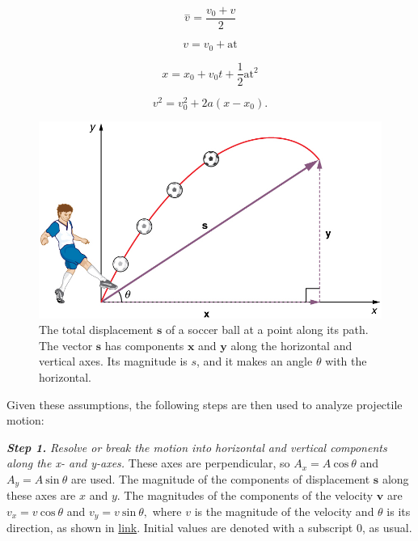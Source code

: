 \documentclass[
]{book}
\begin{document}
\leavevmode{}%
\[{{\overset{-}{v} =}\frac{v_{0} + v}{2}}{}\]

\leavevmode{}%
\[{v = {v_{0} + \text{at}}}{}\]

\leavevmode{}%
\[{{x = {x_{0} + v_{0}}}{t + \frac{1}{2}}\text{at}^{2}}{}\]

\leavevmode{}%
\[{{v^{2} = {v_{0}^{2} + 2a}}({x - x_{0}})}\text{.}{}\]

\begin{figure}
\hypertarget{import-auto-id2242290}{%
\centering
\includegraphics{images/Figure_03_04_01.jpg}
\caption{The total displacement \(\mathbf{s}{}\) of a soccer ball at a point
along its path. The vector \(\mathbf{s}{}\) has components \(\mathbf{x}{}\)
and \(\mathbf{y}{}\) along the horizontal and vertical axes. Its magnitude
is \(s{}\), and it makes an angle \(\theta{}\) with the
horizontal.}\label{import-auto-id2242290}
}
\end{figure}

Given these assumptions, the following steps are then used to analyze
projectile motion:

\textbf{\emph{Step 1.}} \emph{Resolve or break the motion into horizontal and vertical
components along the x- and y-axes.} These axes are perpendicular, so
\({{A_{x} = A}\ \text{cos}\ \theta}{}\) and
\({{A_{y} = A}\ \text{sin}\ \theta}{}\) are used. The magnitude of the
components of displacement \(\mathbf{s}{}\) along these axes are \(x{}\) and
\({y.}{}\) The magnitudes of the components of the velocity \(\mathbf{v}{}\)
are \({{v_{x} = v}\ \text{cos}\ \theta}{}\) and
\({{v_{y} = v}\ \text{sin}\ {\theta,}}{}\) where \(v{}\) is the magnitude of
the velocity and \(\theta{}\) is its direction, as shown in
\protect\hyperlink{import-auto-id1815222}{link}. Initial values
are denoted with a subscript 0, as usual.
\end{document}
